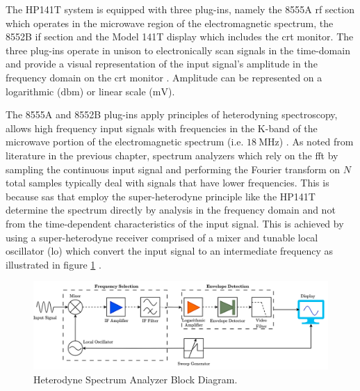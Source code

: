 \documentclass[class=report,11pt,crop=false]{standalone}
\begin{document}
	The HP141T system is equipped with three plug-ins, namely the 8555A \acrshort{rf} section which operates in the microwave region of the electromagnetic spectrum, the 8552B \acrshort{if} section and the Model 141T display which includes the \acrshort{crt} monitor. The three plug-ins operate in unison to electronically scan signals in the time-domain and provide a visual representation of the input signal's amplitude in the frequency domain on the \acrshort{crt} monitor \cite{HP8555A}. Amplitude can be represented on a logarithmic ($\si{\decibel\meter}$) or linear scale ($\si{\milli\volt}$). 
	
	The 8555A and 8552B plug-ins apply principles of heterodyning spectroscopy, allows high frequency input signals with frequencies in the K-band of the microwave portion of the electromagnetic spectrum (i.e. $\SI{18}{\mega\hertz}$) \cite{harris2003}. As noted from literature in the previous chapter, spectrum analyzers which rely on the \acrshort{fft} by sampling the continuous input signal and performing the Fourier transform on $N$ total samples typically deal with signals that have lower frequencies. This is because \acrshort{sa}s that employ the super-heterodyne principle like the HP141T determine the spectrum directly by analysis in the frequency domain and not from the time-dependent characteristics of the input signal. This is achieved by using a super-heterodyne receiver comprised of a mixer and tunable local oscillator (\acrshort{lo}) which convert the input signal to an intermediate frequency as illustrated in figure \ref{fig:heterodyne-rauscher} \cite{rauscher2007}. 
	
	\begin{figure}[!ht]
		\centering
		\label{fig:heterodyne-rauscher}
		\includegraphics[width=1.0\linewidth]{Figures/Methodology/heterodyne-rauscher.png}
		\caption{Heterodyne Spectrum Analyzer Block Diagram.}
	\end{figure}
	
\end{document}

